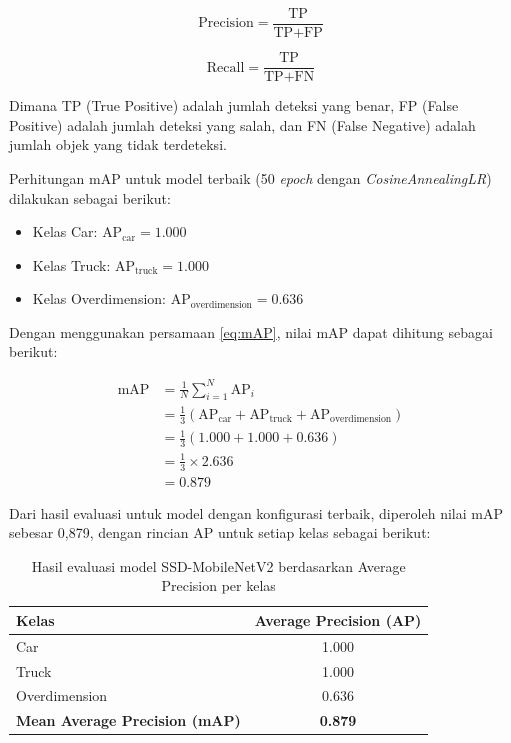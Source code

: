 \begin{equation}
\text{Precision} = \frac{\text{TP}}{\text{TP} + \text{FP}}
\label{eq:precision}
\end{equation}

\begin{equation}
\text{Recall} = \frac{\text{TP}}{\text{TP} + \text{FN}}
\label{eq:recall}
\end{equation}

Dimana TP (True Positive) adalah jumlah deteksi yang benar, FP (False Positive) adalah jumlah deteksi yang salah, dan FN (False Negative) adalah jumlah objek yang tidak terdeteksi.

Perhitungan mAP untuk model terbaik (50 \emph{epoch} dengan \emph{CosineAnnealingLR}) dilakukan sebagai berikut:

\begin{itemize}
  \item Kelas Car: $\text{AP}_{\text{car}} = 1.000$
  \item Kelas Truck: $\text{AP}_{\text{truck}} = 1.000$
  \item Kelas Overdimension: $\text{AP}_{\text{overdimension}} = 0.636$
\end{itemize}

Dengan menggunakan persamaan \ref{eq:mAP}, nilai mAP dapat dihitung sebagai berikut:

\begin{align}
\text{mAP} &= \frac{1}{N} \sum_{i=1}^{N} \text{AP}_i \\
&= \frac{1}{3} (\text{AP}_{\text{car}} + \text{AP}_{\text{truck}} + \text{AP}_{\text{overdimension}}) \\
&= \frac{1}{3} (1.000 + 1.000 + 0.636) \\
&= \frac{1}{3} \times 2.636 \\
&= 0.879
\end{align}

Dari hasil evaluasi untuk model dengan konfigurasi terbaik, diperoleh nilai mAP sebesar 0,879, dengan rincian AP untuk setiap kelas sebagai berikut:

\begin{table}[htbp]
  \centering
  \begin{tabular}{|l|c|}
    \hline
    \rowcolor[HTML]{C0C0C0}
    \textbf{Kelas} & \textbf{Average Precision (AP)} \\
    \hline
    Car & 1.000 \\
    \hline
    Truck & 1.000 \\
    \hline
    Overdimension & 0.636 \\
    \hline
    \textbf{Mean Average Precision (mAP)} & \textbf{0.879} \\
    \hline
  \end{tabular}
  \caption{Hasil evaluasi model SSD-MobileNetV2 berdasarkan Average Precision per kelas}
  \label{tab:ap_results}
\end{table}

